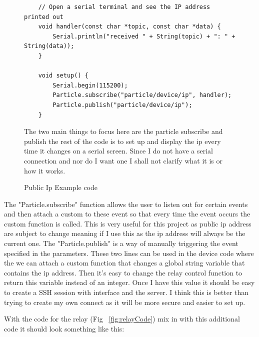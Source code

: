 \documentclass{article}
\begin{document}
\begin{figure}[H]
    \begin{lstlisting}
    // Open a serial terminal and see the IP address printed out
    void handler(const char *topic, const char *data) {
        Serial.println("received " + String(topic) + ": " + String(data));
    }

    void setup() {
        Serial.begin(115200);
        Particle.subscribe("particle/device/ip", handler);
        Particle.publish("particle/device/ip");
    }
    \end{lstlisting}
    \caption{Public Ip Example code} \label{fig:publicIpExample}
    The two main things to focus here are the particle subscribe and publish the rest of the
    code is to set up and display the ip every time it changes on a serial screen. Since
    I do not have a serial connection and nor do I want one I shall not clarify what it
    is or how it works.
\end{figure}

The "Particle.subscribe" function allows the user to listen out for certain events and then
attach a custom to these event so that every time the event occurs the custom function is
called. This is very useful for this project as  public ip address are subject to change meaning
if I use this as the ip address will always be the current one. The "Particle.publish" is a way
of manually triggering the event specified in the parameters. These two lines can be used
in the device code where the we can attach a custom function that changes a global string variable
that contains the ip address. Then it's easy to change the relay control function to return this
variable instead of an integer. Once I have this value it should be easy to create a SSH session
with interface and the server. I think this is better than trying to create my own connect as it
will be more secure and easier to set up.

With the code for the relay (Fig ~\ref{fig:relayCode}) mix in with this additional code it should look
something like this:
\end{document}
